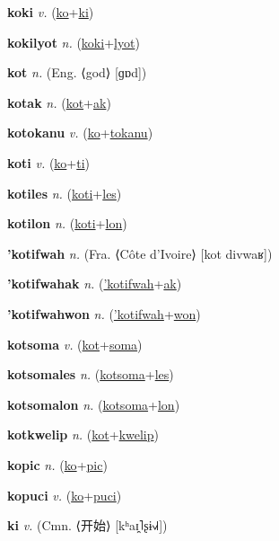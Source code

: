 \textbf{\hypertarget{koki}{koki}} \textit{v.} (\hyperlink{ko}{ko}+\allowbreak \hyperlink{ki}{ki})


\textbf{\hypertarget{kokilyot}{kokilyot}} \textit{n.} (\hyperlink{koki}{koki}+\allowbreak \hyperlink{lyot}{lyot})


\textbf{\hypertarget{kot}{kot}} \textit{n.} (Eng. ⟨god⟩ [ɡɒd])


\textbf{\hypertarget{kotak}{kotak}} \textit{n.} (\hyperlink{kot}{kot}+\allowbreak \hyperlink{ak}{ak})


\textbf{\hypertarget{kotokanu}{kotokanu}} \textit{v.} (\hyperlink{ko}{ko}+\allowbreak \hyperlink{tokanu}{tokanu})


\textbf{\hypertarget{koti}{koti}} \textit{v.} (\hyperlink{ko}{ko}+\allowbreak \hyperlink{ti}{ti})


\textbf{\hypertarget{kotiles}{kotiles}} \textit{n.} (\hyperlink{koti}{koti}+\allowbreak \hyperlink{les}{les})


\textbf{\hypertarget{kotilon}{kotilon}} \textit{n.} (\hyperlink{koti}{koti}+\allowbreak \hyperlink{lon}{lon})


\textbf{\hypertarget{'kotifwah}{'kotifwah}} \textit{n.} (Fra. ⟨Côte d’Ivoire⟩ [kot divwaʁ])


\textbf{\hypertarget{'kotifwahak}{'kotifwahak}} \textit{n.} (\hyperlink{'kotifwah}{'kotifwah}+\allowbreak \hyperlink{ak}{ak})


\textbf{\hypertarget{'kotifwahwon}{'kotifwahwon}} \textit{n.} (\hyperlink{'kotifwah}{'kotifwah}+\allowbreak \hyperlink{won}{won})


\textbf{\hypertarget{kotsoma}{kotsoma}} \textit{v.} (\hyperlink{kot}{kot}+\allowbreak \hyperlink{soma}{soma})


\textbf{\hypertarget{kotsomales}{kotsomales}} \textit{n.} (\hyperlink{kotsoma}{kotsoma}+\allowbreak \hyperlink{les}{les})


\textbf{\hypertarget{kotsomalon}{kotsomalon}} \textit{n.} (\hyperlink{kotsoma}{kotsoma}+\allowbreak \hyperlink{lon}{lon})


\textbf{\hypertarget{kotkwelip}{kotkwelip}} \textit{n.} (\hyperlink{kot}{kot}+\allowbreak \hyperlink{kwelip}{kwelip})


\textbf{\hypertarget{kopic}{kopic}} \textit{n.} (\hyperlink{ko}{ko}+\allowbreak \hyperlink{pic}{pic})


\textbf{\hypertarget{kopuci}{kopuci}} \textit{v.} (\hyperlink{ko}{ko}+\allowbreak \hyperlink{puci}{puci})


\textbf{\hypertarget{ki}{ki}} \textit{v.} (Cmn. ⟨{\chinese{}开始}⟩ [kʰaɪ̯˥ʂɨ˧˩˧])


